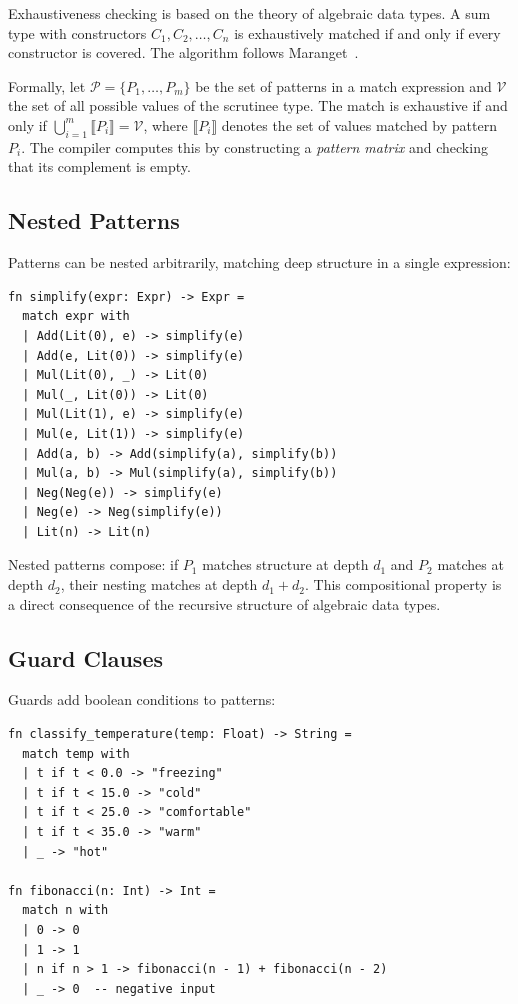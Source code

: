 \documentclass[11pt,a4paper]{article}
\begin{document}
Exhaustiveness checking is based on the theory of algebraic data types. A sum type with constructors $C_1, C_2, \ldots, C_n$ is exhaustively matched if and only if every constructor is covered. The algorithm follows Maranget~\citep{maranget2008compiling}.

Formally, let $\mathcal{P} = \{P_1, \ldots, P_m\}$ be the set of patterns in a match expression and $\mathcal{V}$ the set of all possible values of the scrutinee type. The match is exhaustive if and only if $\bigcup_{i=1}^{m} \llbracket P_i \rrbracket = \mathcal{V}$, where $\llbracket P_i \rrbracket$ denotes the set of values matched by pattern $P_i$. The compiler computes this by constructing a \emph{pattern matrix} and checking that its complement is empty.

\subsection{Nested Patterns}

Patterns can be nested arbitrarily, matching deep structure in a single expression:

\begin{lstlisting}
fn simplify(expr: Expr) -> Expr =
  match expr with
  | Add(Lit(0), e) -> simplify(e)
  | Add(e, Lit(0)) -> simplify(e)
  | Mul(Lit(0), _) -> Lit(0)
  | Mul(_, Lit(0)) -> Lit(0)
  | Mul(Lit(1), e) -> simplify(e)
  | Mul(e, Lit(1)) -> simplify(e)
  | Add(a, b) -> Add(simplify(a), simplify(b))
  | Mul(a, b) -> Mul(simplify(a), simplify(b))
  | Neg(Neg(e)) -> simplify(e)
  | Neg(e) -> Neg(simplify(e))
  | Lit(n) -> Lit(n)
\end{lstlisting}

Nested patterns compose: if $P_1$ matches structure at depth $d_1$ and $P_2$ matches at depth $d_2$, their nesting matches at depth $d_1 + d_2$. This compositional property is a direct consequence of the recursive structure of algebraic data types.

\subsection{Guard Clauses}

Guards add boolean conditions to patterns:

\begin{lstlisting}
fn classify_temperature(temp: Float) -> String =
  match temp with
  | t if t < 0.0 -> "freezing"
  | t if t < 15.0 -> "cold"
  | t if t < 25.0 -> "comfortable"
  | t if t < 35.0 -> "warm"
  | _ -> "hot"

fn fibonacci(n: Int) -> Int =
  match n with
  | 0 -> 0
  | 1 -> 1
  | n if n > 1 -> fibonacci(n - 1) + fibonacci(n - 2)
  | _ -> 0  -- negative input
\end{lstlisting}
\end{document}
